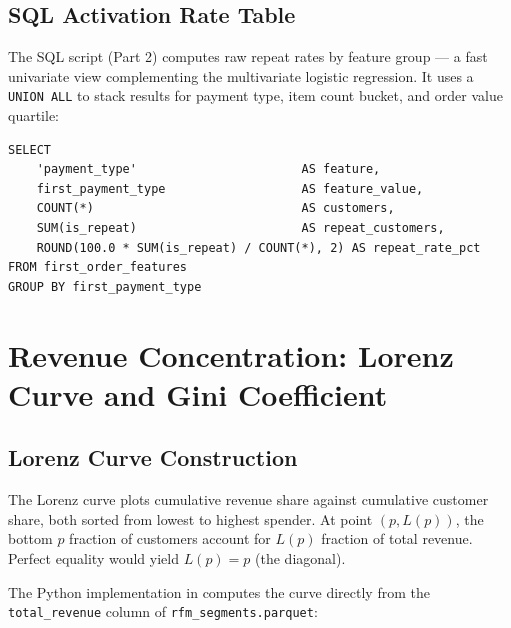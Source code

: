 \subsection{SQL Activation Rate Table}

The SQL script  (Part 2) computes raw
repeat rates by feature group --- a fast univariate view complementing the
multivariate logistic regression. It uses a \texttt{UNION ALL} to stack results
for payment type, item count bucket, and order value quartile:

\begin{lstlisting}[style=sql, caption={Activation rates by payment type (excerpt from \filepath{sql/04\_ltv\_activation.sql})}]
SELECT
    'payment_type'                       AS feature,
    first_payment_type                   AS feature_value,
    COUNT(*)                             AS customers,
    SUM(is_repeat)                       AS repeat_customers,
    ROUND(100.0 * SUM(is_repeat) / COUNT(*), 2) AS repeat_rate_pct
FROM first_order_features
GROUP BY first_payment_type
\end{lstlisting}

\section{Revenue Concentration: Lorenz Curve and Gini Coefficient}
\label{sec:ecom-lorenz}


\subsection{Lorenz Curve Construction}

The Lorenz curve plots cumulative revenue share against cumulative customer
share, both sorted from lowest to highest spender. At point $(p, L(p))$, the
bottom $p$ fraction of customers account for $L(p)$ fraction of total revenue.
Perfect equality would yield $L(p) = p$ (the diagonal).

The Python implementation in 
computes the curve directly from the \texttt{total\_revenue} column of
\texttt{rfm\_segments.parquet}:

